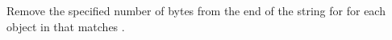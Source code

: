 Remove the specified number of bytes from the end of the string for for each
object in  that matches .


